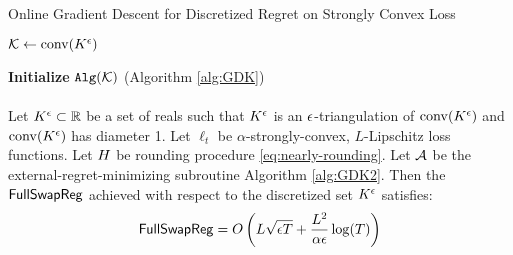 \begin{algorithm}
\caption{Online Gradient Descent for Discretized Regret on Strongly Convex Loss}
\label{alg:GDK2}

$\mathcal{K} \gets \mathrm{conv}(K^{\epsilon})$

\textbf{Initialize} $\mathtt{Alg}(\mathcal{K})$ (Algorithm \ref{alg:GDK})


\end{algorithm}





















\paragraph{}
    Let $K^{\epsilon} \subset \mathbb{R}$ be a set of reals such that $K^{\epsilon}$ is an $\epsilon$-triangulation of $\mathrm{conv}(K^{\epsilon})$ and $\mathrm{conv}(K^{\epsilon})$ has diameter 1.  Let $\ell_t$ be $\alpha$-strongly-convex, $L$-Lipschitz loss functions.  Let $H$ be rounding procedure \eqref{eq:nearly-rounding}. Let $\mathcal{A}$ be the external-regret-minimizing subroutine Algorithm \ref{alg:GDK2}. Then the $\mathsf{FullSwapReg}$ achieved with respect to the discretized set $K^{\epsilon}$ satisfies:
    \begin{equation*}
        \mathsf{FullSwapReg} = O\left(L\sqrt{\epsilon T}+\frac{L^2}{\alpha \epsilon}\log(T)\right)
    \end{equation*}



